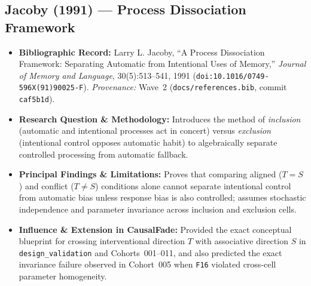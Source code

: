 \subsection{Jacoby (1991) --- Process Dissociation Framework \citep{jacoby1991process}}
\begin{itemize}
  \item \textbf{Bibliographic Record:} Larry L. Jacoby, ``A Process Dissociation Framework: Separating Automatic from Intentional Uses of Memory,'' \emph{Journal of Memory and Language}, 30(5):513--541, 1991 (\texttt{doi:10.1016/0749-596X(91)90025-F}). \emph{Provenance:} Wave~2 (\texttt{docs/references.bib}, commit \texttt{caf5b1d}).
  \item \textbf{Research Question \& Methodology:} Introduces the method of \emph{inclusion} (automatic and intentional processes act in concert) versus \emph{exclusion} (intentional control opposes automatic habit) to algebraically separate controlled processing from automatic fallback.
  \item \textbf{Principal Findings \& Limitations:} Proves that comparing aligned ($T=S$) and conflict ($T\neq S$) conditions alone cannot separate intentional control from automatic bias unless response bias is also controlled; assumes stochastic independence and parameter invariance across inclusion and exclusion cells.
  \item \textbf{Influence \& Extension in CausalFade:} Provided the exact conceptual blueprint for crossing interventional direction $T$ with associative direction $S$ in \texttt{design\_validation} and Cohorts~001--011, and also predicted the exact invariance failure observed in Cohort~005 when \texttt{F16} violated cross-cell parameter homogeneity.
\end{itemize}

